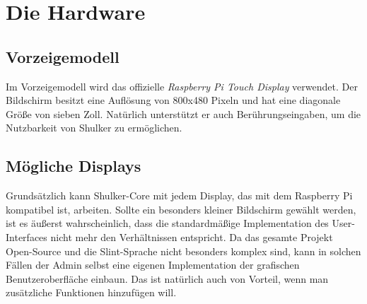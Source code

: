 \section{Die Hardware}

\subsection{Vorzeigemodell}
Im Vorzeigemodell wird das offizielle \textit{Raspberry Pi Touch Display} verwendet. Der Bildschirm besitzt eine Auflösung von
800x480 Pixeln und hat eine diagonale Größe von sieben Zoll. Natürlich unterstützt er auch Berührungseingaben, um die Nutzbarkeit
von Shulker zu ermöglichen.

\subsection{Mögliche Displays}
Grundsätzlich kann Shulker-Core mit jedem Display, das mit dem Raspberry Pi kompatibel ist, arbeiten. Sollte ein besonders kleiner
Bildschirm gewählt werden, ist es äußerst wahrscheinlich, dass die standardmäßige Implementation des User-Interfaces nicht mehr
den Verhältnissen entspricht. Da das gesamte Projekt Open-Source und die Slint-Sprache nicht besonders komplex sind, kann
in solchen Fällen der Admin selbst eine eigenen Implementation der grafischen Benutzeroberfläche einbaun. Das ist natürlich auch von
Vorteil, wenn man zusätzliche Funktionen hinzufügen will.